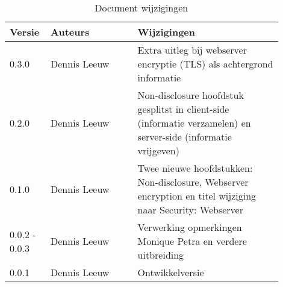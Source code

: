 \begin{flushleft}
\begin{table}[h!]
\centering
	\begin{tabularx}{\textwidth}{ |p{0.1\linewidth}|p{0.3\linewidth}|p{0.5\linewidth}| }
\hline
	Versie &
	Auteurs &
	Wijzigingen\\
\hline
	0.3.0 &
	Dennis Leeuw &
		Extra uitleg bij webserver encryptie (TLS) als achtergrond informatie\\
\hline
	0.2.0 &
	Dennis Leeuw &
	Non-disclosure hoofdstuk gesplitst in client-side (informatie verzamelen) en server-side (informatie vrijgeven)\\
\hline
	0.1.0 &
	Dennis Leeuw &
	Twee nieuwe hoofdstukken: Non-disclosure, Webserver encryption en titel wijziging naar Security: Webserver\\
\hline
	0.0.2 - 0.0.3 &
	Dennis Leeuw &
	Verwerking opmerkingen Monique Petra en verdere uitbreiding\\
\hline
	0.0.1 &
	Dennis Leeuw &
	Ontwikkelversie\\
\hline
\hline
\end{tabularx}
\caption{Document wijzigingen}
\label{table:1}
\end{table}
\end{flushleft}

